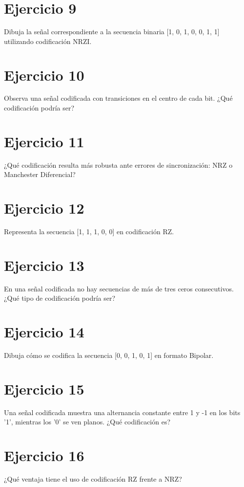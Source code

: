 \documentclass[a4paper,12pt]{article}
\begin{document}
\section*{Ejercicio 9}
Dibuja la señal correspondiente a la secuencia binaria [1, 0, 1, 0, 0, 1, 1] utilizando codificación NRZI.

\section*{Ejercicio 10}
Observa una señal codificada con transiciones en el centro de cada bit. ¿Qué codificación podría ser?

\section*{Ejercicio 11}
¿Qué codificación resulta más robusta ante errores de sincronización: NRZ o Manchester Diferencial?

\section*{Ejercicio 12}
Representa la secuencia [1, 1, 1, 0, 0] en codificación RZ.

\section*{Ejercicio 13}
En una señal codificada no hay secuencias de más de tres ceros consecutivos. ¿Qué tipo de codificación podría ser?

\section*{Ejercicio 14}
Dibuja cómo se codifica la secuencia [0, 0, 1, 0, 1] en formato Bipolar.

\section*{Ejercicio 15}
Una señal codificada muestra una alternancia constante entre 1 y -1 en los bits '1', mientras los '0' se ven planos. ¿Qué codificación es?

\section*{Ejercicio 16}
¿Qué ventaja tiene el uso de codificación RZ frente a NRZ?
\end{document}
